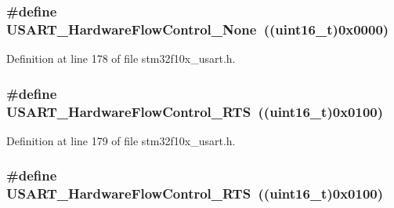 \subsubsection[{\texorpdfstring{U\+S\+A\+R\+T\+\_\+\+Hardware\+Flow\+Control\+\_\+\+None}{USART_HardwareFlowControl_None}}]{\setlength{\rightskip}{0pt plus 5cm}\#define U\+S\+A\+R\+T\+\_\+\+Hardware\+Flow\+Control\+\_\+\+None~(({\bf uint16\+\_\+t})0x0000)}\hypertarget{group___u_s_a_r_t___hardware___flow___control_gaf3deaf4429b88db7753ee203f4797bd3}{}\label{group___u_s_a_r_t___hardware___flow___control_gaf3deaf4429b88db7753ee203f4797bd3}


Definition at line 178 of file stm32f10x\+\_\+usart.\+h.

\subsubsection[{\texorpdfstring{U\+S\+A\+R\+T\+\_\+\+Hardware\+Flow\+Control\+\_\+\+R\+TS}{USART_HardwareFlowControl_RTS}}]{\setlength{\rightskip}{0pt plus 5cm}\#define U\+S\+A\+R\+T\+\_\+\+Hardware\+Flow\+Control\+\_\+\+R\+TS~(({\bf uint16\+\_\+t})0x0100)}\hypertarget{group___u_s_a_r_t___hardware___flow___control_ga22d4339693e3356d992abca259b0418e}{}\label{group___u_s_a_r_t___hardware___flow___control_ga22d4339693e3356d992abca259b0418e}


Definition at line 179 of file stm32f10x\+\_\+usart.\+h.

\subsubsection[{\texorpdfstring{U\+S\+A\+R\+T\+\_\+\+Hardware\+Flow\+Control\+\_\+\+R\+TS}{USART_HardwareFlowControl_RTS}}]{\setlength{\rightskip}{0pt plus 5cm}\#define U\+S\+A\+R\+T\+\_\+\+Hardware\+Flow\+Control\+\_\+\+R\+TS~(({\bf uint16\+\_\+t})0x0100)}\hypertarget{group___u_s_a_r_t___hardware___flow___control_ga22d4339693e3356d992abca259b0418e}{}\label{group___u_s_a_r_t___hardware___flow___control_ga22d4339693e3356d992abca259b0418e}


